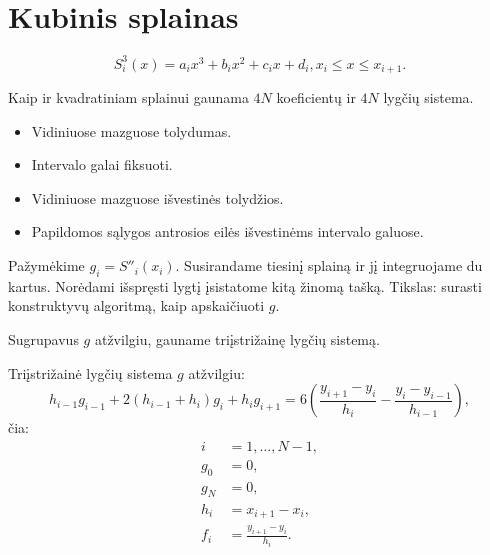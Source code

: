 
\section{Kubinis splainas}


\begin{equation*}
  S_{i}^{3}(x) = a_{i}x^{3} + b_{i}x^{2} + c_{i}x + d_{i},
    x_{i} \leq x \leq x_{i+1}.
\end{equation*}

Kaip ir kvadratiniam splainui gaunama $4N$ koeficientų ir $4N$ lygčių
sistema.

\begin{itemize}
  \item Vidiniuose mazguose tolydumas.
  \item Intervalo galai fiksuoti.
  \item Vidiniuose mazguose išvestinės tolydžios.
  \item Papildomos sąlygos antrosios eilės išvestinėms intervalo galuose.
\end{itemize}






Pažymėkime $g_{i} = S''_{i}(x_{i})$. Susirandame tiesinį splainą ir
jį integruojame du kartus. Norėdami išspręsti lygtį įsistatome
kitą žinomą tašką. Tikslas: surasti konstruktyvų algoritmą, kaip
apskaičiuoti $g$.


Sugrupavus $g$ atžvilgiu, gauname triįstrižainę lygčių sistemą.


Triįstrižainė lygčių sistema $g$ atžvilgiu:
\begin{equation*}
  h_{i-1}g_{i-1} + 2(h_{i-1}+h_{i})g_{i} + h_{i}g_{i+1}
    = 6\left(
        \frac{y_{i+1} - y_{i}}{h_{i}}
        - \frac{y_{i}-y_{i-1}}{h_{i-1}} \right),
\end{equation*}
čia:
\begin{align*}
  i &= 1,\ldots,N-1, \\
  g_{0} &= 0, \\
  g_{N} &= 0, \\
  h_{i} &= x_{i+1} - x_{i}, \\
  f_{i} &= \frac{y_{i+1} - y_{i}}{h_{i}}. \\
\end{align*}

